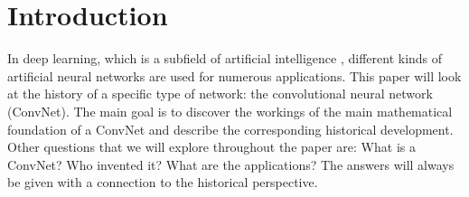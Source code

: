 

\section*{Introduction}

In deep learning, which is a subfield of artificial intelligence \cite[Ch. 1]{dl-book}, %
different kinds of artificial neural networks are used for numerous applications. This paper will look at the history of a specific type of network: the convolutional neural network (ConvNet). The main goal is to discover the workings of the main mathematical foundation of a ConvNet and describe the corresponding historical development. Other questions that we will explore throughout the paper are: What is a ConvNet? Who invented it? What are the applications? The answers will always be given with a connection to the historical perspective.\\





